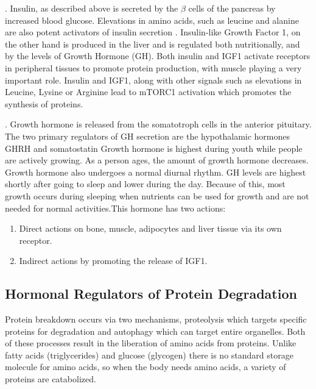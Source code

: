 \documentclass{tufte-handout}
\begin{document}
.  Insulin, as described above is secreted by the $\beta$ cells of the pancreas by increased blood glucose.  Elevations in amino acids, such as leucine and alanine are also potent activators of insulin secretion \citep{Floyd1966}.  Insulin-like Growth Factor 1, on the other hand is produced in the liver and is regulated both nutritionally, and by the levels of Growth Hormone (GH).  Both insulin and IGF1 activate receptors in peripheral tissues to promote protein production, with muscle playing a very important role.   Insulin and IGF1, along with other signals such as elevations in Leucine, Lysine or Arginine lead to mTORC1 activation which promotes the synthesis of proteins.

.  Growth hormone is released from the somatotroph cells in the anterior pituitary.  The two primary regulators of GH secretion are the hypothalamic hormones GHRH and somatostatin  Growth hormone is highest during youth while people are actively growing.  As a person ages, the amount of growth hormone decreases.  Growth hormone also undergoes a normal diurnal rhythm.  GH levels are highest shortly after going to sleep and lower during the day.  Because of this, most growth occurs during sleeping when nutrients can be used for growth and are not needed for normal activities.This hormone has two actions:
\begin{enumerate}
\item Direct actions on bone, muscle, adipocytes and liver tissue via its own receptor.
\item Indirect actions by promoting the release of IGF1.
\end{enumerate}

\subsection{Hormonal Regulators of Protein Degradation}
Protein breakdown occurs via two mechanisms, proteolysis which targets specific proteins for degradation and autophagy which can target entire organelles.  Both of these processes result in the liberation of amino acids from proteins.  Unlike fatty acids (triglycerides) and glucose (glycogen) there is no standard storage molecule for amino acids, so when the body needs amino acids, a variety of proteins are catabolized. 
\end{document}
